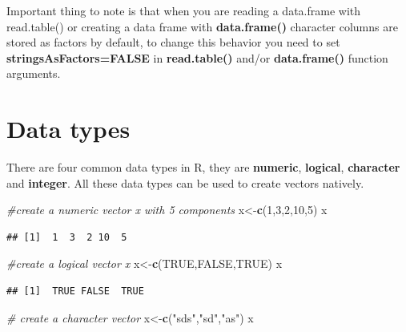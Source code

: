 \documentclass[12pt,]{krantz}
\newenvironment{Shaded}{\begin{snugshade}}{\end{snugshade}}
\newcommand{\CommentTok}[1]{\textcolor[rgb]{0.56,0.35,0.01}{\textit{#1}}}
\newcommand{\DecValTok}[1]{\textcolor[rgb]{0.00,0.00,0.81}{#1}}
\newcommand{\KeywordTok}[1]{\textcolor[rgb]{0.13,0.29,0.53}{\textbf{#1}}}
\newcommand{\NormalTok}[1]{#1}
\newcommand{\OtherTok}[1]{\textcolor[rgb]{0.56,0.35,0.01}{#1}}
\newcommand{\StringTok}[1]{\textcolor[rgb]{0.31,0.60,0.02}{#1}}
\theoremstyle{definition}
\theoremstyle{definition}
\theoremstyle{definition}
\theoremstyle{remark}
\begin{document}
Important thing to note is that when you are reading a data.frame with
read.table() or creating a data frame with \textbf{data.frame()}
character columns are stored as factors by default, to change this
behavior you need to set \textbf{stringsAsFactors=FALSE} in
\textbf{read.table()} and/or \textbf{data.frame()} function arguments.

\hypertarget{data-types}{%
\section{Data types}\label{data-types}}

There are four common data types in R, they are \textbf{numeric},
\textbf{logical}, \textbf{character} and \textbf{integer}. All these
data types can be used to create vectors natively.

\begin{Shaded}
\begin{Highlighting}[]
\CommentTok{#create a numeric vector x with 5 components}
\NormalTok{x<-}\KeywordTok{c}\NormalTok{(}\DecValTok{1}\NormalTok{,}\DecValTok{3}\NormalTok{,}\DecValTok{2}\NormalTok{,}\DecValTok{10}\NormalTok{,}\DecValTok{5}\NormalTok{)}
\NormalTok{x}
\end{Highlighting}
\end{Shaded}

\begin{verbatim}
## [1]  1  3  2 10  5
\end{verbatim}

\begin{Shaded}
\begin{Highlighting}[]
\CommentTok{#create a logical vector x}
\NormalTok{x<-}\KeywordTok{c}\NormalTok{(}\OtherTok{TRUE}\NormalTok{,}\OtherTok{FALSE}\NormalTok{,}\OtherTok{TRUE}\NormalTok{)}
\NormalTok{x}
\end{Highlighting}
\end{Shaded}

\begin{verbatim}
## [1]  TRUE FALSE  TRUE
\end{verbatim}

\begin{Shaded}
\begin{Highlighting}[]
\CommentTok{# create a character vector}
\NormalTok{x<-}\KeywordTok{c}\NormalTok{(}\StringTok{"sds"}\NormalTok{,}\StringTok{"sd"}\NormalTok{,}\StringTok{"as"}\NormalTok{)}
\NormalTok{x}
\end{Highlighting}
\end{Shaded}
\end{document}
